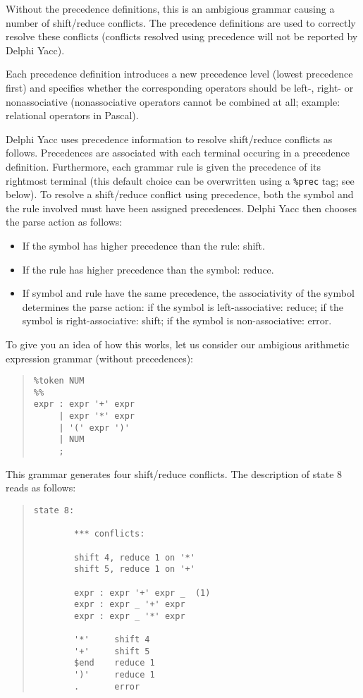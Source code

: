 \documentclass[a4paper]{article}
\begin{document}
Without the precedence definitions, this is an ambigious grammar causing
a number of shift/reduce conflicts. The precedence definitions are used
to correctly resolve these conflicts (conflicts resolved using precedence
will not be reported by Delphi Yacc).

Each precedence definition introduces a new precedence level (lowest
precedence first) and specifies whether the corresponding operators
should be left-, right- or nonassociative (nonassociative operators
cannot be combined at all; example: relational operators in Pascal).

Delphi Yacc uses precedence information to resolve shift/reduce conflicts as
follows. Precedences are associated with each terminal occuring in a
precedence definition. Furthermore, each grammar rule is given the
precedence of its rightmost terminal (this default choice can be
overwritten using a \verb"%prec" tag; see below). To resolve a shift/reduce
conflict using precedence, both the symbol and the rule involved must
have been assigned precedences. Delphi Yacc then chooses the parse action
as follows:

\begin{itemize}
   \item
      If the symbol has higher precedence than the rule: shift.
   \item
      If the rule has higher precedence than the symbol: reduce.
   \item
      If symbol and rule have the same precedence, the associativity of the
      symbol determines the parse action: if the symbol is left-associative:
      reduce; if the symbol is right-associative: shift; if the symbol is
      non-associative: error.
\end{itemize}

To give you an idea of how this works, let us consider our ambigious
arithmetic expression grammar (without precedences):

\begin{quote}\begin{verbatim}
%token NUM
%%
expr : expr '+' expr
     | expr '*' expr
     | '(' expr ')'
     | NUM
     ;
\end{verbatim}\end{quote}

This grammar generates four shift/reduce conflicts. The description
of state 8 reads as follows:

\begin{quote}\begin{verbatim}
state 8:

        *** conflicts:

        shift 4, reduce 1 on '*'
        shift 5, reduce 1 on '+'

        expr : expr '+' expr _  (1)
        expr : expr _ '+' expr
        expr : expr _ '*' expr

        '*'     shift 4
        '+'     shift 5
        $end    reduce 1
        ')'     reduce 1
        .       error
\end{verbatim}\end{quote}
\end{document}
